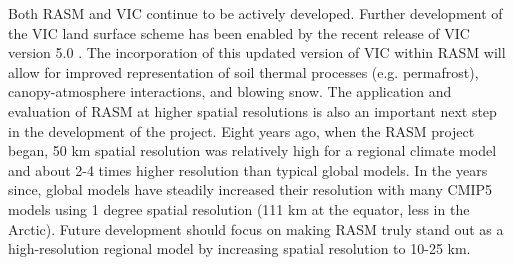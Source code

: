Both RASM and VIC continue to be actively developed.
Further development of the VIC land surface scheme has been enabled by the recent release of VIC version 5.0 \citep[see also \ref{sec:vic_dev}][]{Hamman_2016c,Hamman_2016d}.
The incorporation of this updated version of VIC within RASM will allow for improved representation of soil thermal processes (e.g. permafrost), canopy-atmosphere interactions, and blowing snow.
The application and evaluation of RASM at higher spatial resolutions is also an important next step in the development of the project.
Eight years ago, when the RASM project began, 50 km spatial resolution was relatively high for a regional climate model and about 2-4 times higher resolution than typical global models.
In the years since, global models have steadily increased their resolution with many CMIP5 models using 1 degree spatial resolution (111 km at the equator, less in the Arctic).
Future development should focus on making RASM truly stand out as a high-resolution regional model by increasing spatial resolution to 10-25 km.
